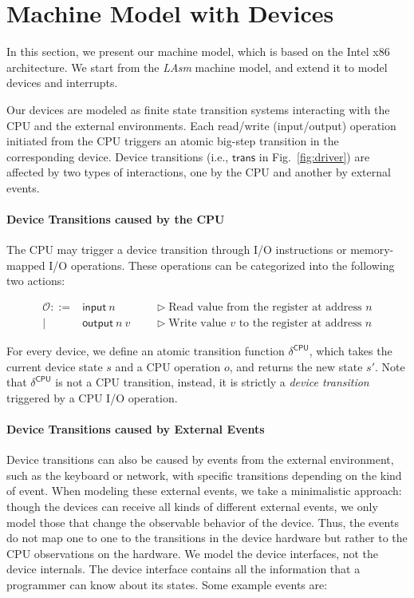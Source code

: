 \section{Machine Model with Devices}
\label{sec:model}

In this section, we present our machine model, which is based on the Intel x86
architecture. We start from the {\it LAsm} machine model, and extend it
to model devices and interrupts.

Our devices are modeled as finite state transition systems interacting with the
CPU and the external environments. Each read/write (input/output) operation
initiated from the CPU triggers an atomic big-step transition in the
corresponding device.  Device transitions (i.e., $\textsf{trans}$ in
Fig.~\ref{fig:driver}) are affected by two types of interactions, one by the CPU
and another by external events.

\paragraph{Device Transitions caused by the CPU} The CPU may trigger a
device transition through I/O instructions or memory-mapped I/O
operations. These operations can be categorized into the following
two actions:

\begin{definition}
\[
\begin{array}{rll}
\mathcal{O}::= & \textsf{input} ~  n  &~~~~~~\vartriangleright \text{Read value from the register at address $n$} \\
| & \textsf{output}  ~ n ~ v &~~~~~~\vartriangleright \text{Write value $v$ to the register at address $n$}
\end{array}
\]
\end{definition}

For every device, we define an atomic transition function
$\delta^{\textsf{CPU}}$, which takes the current device state $s$ and
a CPU operation $o$, and returns the new state $s'$. Note that
$\delta^{\textsf{CPU}}$ is not a CPU transition, instead, it is strictly a
{\em device transition} triggered by a CPU I/O operation.

\paragraph{Device Transitions caused by External Events}
Device transitions can also be caused by events from the external
environment, such as the keyboard or network, with specific
transitions depending on the kind of event. When modeling these
external events, we take a minimalistic approach: though the devices
can receive all kinds of different external events, we only model
those that change the observable behavior of the device.  Thus, the
events do not map one to one to the transitions in the device hardware but
rather to the CPU observations on the hardware. We model the device
interfaces, not the device internals. The device interface contains
all the information that a programmer can know about its states.
Some example events are:

